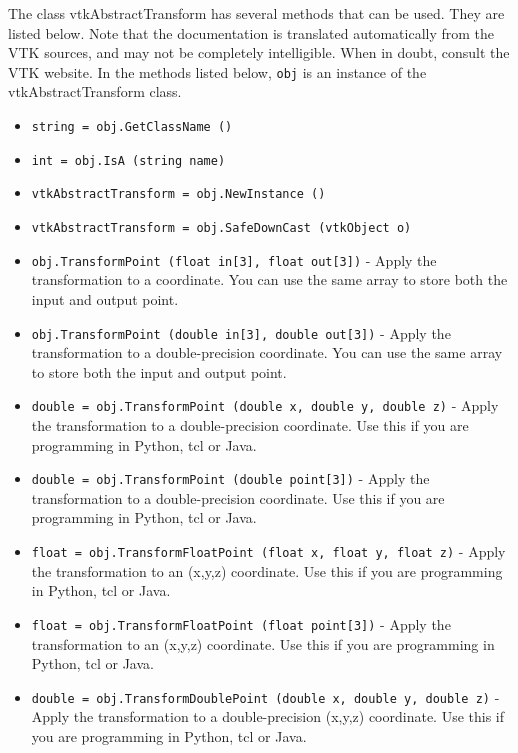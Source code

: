 The class vtkAbstractTransform has several methods that can be used.
  They are listed below.
Note that the documentation is translated automatically from the VTK sources,
and may not be completely intelligible.  When in doubt, consult the VTK website.
In the methods listed below, \verb|obj| is an instance of the vtkAbstractTransform class.
\begin{itemize}
\item  \verb|string = obj.GetClassName ()|

\item  \verb|int = obj.IsA (string name)|

\item  \verb|vtkAbstractTransform = obj.NewInstance ()|

\item  \verb|vtkAbstractTransform = obj.SafeDownCast (vtkObject o)|

\item  \verb|obj.TransformPoint (float in[3], float out[3])| -  Apply the transformation to a coordinate.  You can use the same 
 array to store both the input and output point.

\item  \verb|obj.TransformPoint (double in[3], double out[3])| -  Apply the transformation to a double-precision coordinate.  
 You can use the same array to store both the input and output point.

\item  \verb|double = obj.TransformPoint (double x, double y, double z)| -  Apply the transformation to a double-precision coordinate.  
 Use this if you are programming in Python, tcl or Java.

\item  \verb|double = obj.TransformPoint (double point[3])| -  Apply the transformation to a double-precision coordinate.  
 Use this if you are programming in Python, tcl or Java.

\item  \verb|float = obj.TransformFloatPoint (float x, float y, float z)| -  Apply the transformation to an (x,y,z) coordinate.
 Use this if you are programming in Python, tcl or Java.

\item  \verb|float = obj.TransformFloatPoint (float point[3])| -  Apply the transformation to an (x,y,z) coordinate.
 Use this if you are programming in Python, tcl or Java.

\item  \verb|double = obj.TransformDoublePoint (double x, double y, double z)| -  Apply the transformation to a double-precision (x,y,z) coordinate.
 Use this if you are programming in Python, tcl or Java.


\end{itemize}
